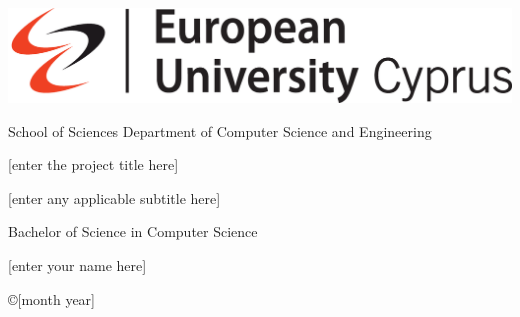 \thispagestyle{empty}
{

\noindent\includegraphics[scale=0.32]{images/euc.jpg}


\begin{center}
 School of Sciences \textbar \; Department of Computer Science and Engineering
\end{center}

\vspace{1.5cm}
\begin{center}
\Huge  [enter the project title here]
\end{center}


\vspace{0.2cm}
\begin{center}
\Large [enter any applicable subtitle here]
\end{center}

\vspace{1.5cm}
\begin{center}\LARGE Bachelor of Science in Computer Science
\end{center}


\vspace{1.5cm}
\begin{center}
\Large [enter your name here]
\end{center}
\vspace{1.5cm}

\noindent
\begin{center}\copyright  [month year]
\end{center}
\newpage
\thispagestyle{empty}

}%
